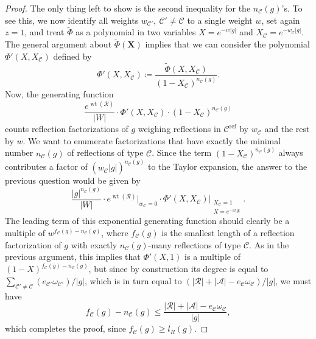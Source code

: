 \documentclass[ALCO, Unicode]{cedram}
\newcommand{\op}[1]{\operatorname{#1}}
\newcommand{\op}[1]{\operatorname{#1}}
\begin{document}
\begin{proof}
The only thing left to show is the second inequality for the $n_{\mathcal{C}}(g)$'s. To see this, we now identify all weights $w_{\mathcal{C}'},\ \mathcal{C}'\neq\mathcal{C}$ to a single weight $w$, set again $z=1$, and treat $\tilde{\Phi}$ as a polynomial in two variables $X=e^{-w|g|}$ and $X_{\mathcal{C}}=e^{-w^{\phantom{l}}_{\mathcal{C}}|g|}$. The general argument about $\tilde{\Phi}(\bm X)$ implies that we can consider the polynomial $\Phi'(X,X_{\mathcal{C}})$ defined by $$\Phi'(X,X_{\mathcal{C}})\coloneqq \dfrac{\tilde{\Phi}(X,X_{\mathcal{C}})}{(1-X_{\mathcal{C}})^{n_{\mathcal{C}}(g)}}.$$
Now, the generating function $$\dfrac{e^{\op{wt}(\mathcal{R})}}{|W|}\cdot\Phi'(X,X_{\mathcal{C}})\cdot(1-X_{\mathcal{C}})^{n_{\mathcal{C}}(g)}$$ counts 
reflection factorizations of $g$ weighing reflections in $\mathcal{C}^{\op{ref}}$ by $w_{\mathcal{C}}$ and the rest by $w$. 
We want to enumerate factorizations that have exactly the minimal number $n_{\mathcal{C}}(g)$ of reflections of type $\mathcal{C}$. 
Since the term $(1-X_{\mathcal{C}})^{n_{\mathcal{C}}(g)}$ always contributes a factor of $(w^{\phantom{l}}_{\mathcal{C}}|g|)^{n_{\mathcal{C}}(g)}$ to the Taylor expansion, the answer to the previous question would be given by $$\dfrac{|g|^{n_{\mathcal{C}}(g)}}{|W|}\cdot e^{\op{wt}(\mathcal{R})}\Big|_{w_{\mathcal{C}}=0}\cdot\Phi'(X,X_{\mathcal{C}})\Bigg|_{\substack{X_{\mathcal{C}}=1\quad\ \\ X=e^{-w|g|}} }.$$
The leading term of this exponential generating function should clearly be a multiple of $w^{f_{\mathcal{C}}(g)-n_{\mathcal{C}}(g)}$, where $f_{\mathcal{C}}(g)$ is the smallest length of a reflection factorization of $g$ with exactly $n_{\mathcal{C}}(g)$-many reflections of type $\mathcal{C}$. As in the previous argument, this implies that $\Phi'(X,1)$ is a multiple of $(1-X)^{f_{\mathcal{C}}(g)-n_{\mathcal{C}}(g)}$, but since by construction its degree is equal to $\sum_{\mathcal{C}'\neq\mathcal{C}}(e_{\mathcal{C}'}\omega_{\mathcal{C}'})/|g|$, which is in turn equal to $\left(|\mathcal{R}|+|\mathcal{A}|-e_{\mathcal{C}}\omega_{\mathcal{C}}\right)/|g|$, we must have 
\[
f_{\mathcal{C}}(g)-n_{\mathcal{C}}(g)\leq \dfrac{|\mathcal{R}|+|\mathcal{A}|-e_{\mathcal{C}}\omega_{\mathcal{C}}}{|g|},
\]
 which completes the proof, since $f_{\mathcal{C}}(g)\geq l_R(g)$.
\end{proof}
\end{document}

